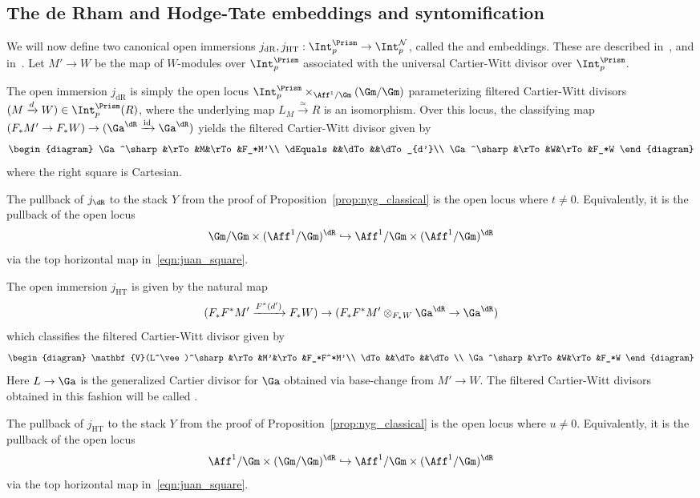 \documentclass[10pt]{amsart}
\begin{document}
\subsection{The de Rham and Hodge-Tate embeddings and syntomification}
\label{subsec:syntomification}

We will now define two canonical open immersions $j_{\mathrm{dR}},j_{\mathrm{HT}}:\Int_p^\Prism\to \Int_p^{\mathcal{N}}$, called the  and  embeddings. These are described in~\cite[\S 5.3,5.6]{drinfeld2022prismatization}, and in~\cite[\S 5.3]{bhatt_lectures}. Let $M'\to W$ be the map of $W$-modules over $\Int_p^\Prism$ associated with the universal Cartier-Witt divisor over $\Int_p^\Prism$.

\begin{definition}
The open immersion $j_{\mathrm{dR}}$ is simply the open locus $\Int_p^\Prism\times_{\Aff^1/\Gm}(\Gm/\Gm)$ parameterizing filtered Cartier-Witt divisors $(M\xrightarrow{d} W)\in \Int_p^\Prism(R)$, where the underlying map $L_M\xrightarrow{\simeq} R$ is an isomorphism. Over this locus, the classifying map $(F_*M'\to F_*W) \to (\Ga^{\dR}\xrightarrow{\mathrm{id}}\Ga^{\dR})$ yields the filtered Cartier-Witt divisor given by
\[
\begin{diagram}
\Ga^\sharp&\rTo&M&\rTo&F_*M'\\
\dEquals&&\dTo&&\dTo_{d'}\\
\Ga^\sharp&\rTo&W&\rTo&F_*W
\end{diagram}
\]
where the right square is Cartesian.

The pullback of $j_{\dR}$ to the stack $Y$ from the proof of Proposition~\ref{prop:nyg_classical} is the open locus where $t\neq 0$. Equivalently, it is the pullback of the open locus 
\[
\Gm/\Gm \times (\Aff^1/\Gm)^{\dR} \hookrightarrow \Aff^1/\Gm\times (\Aff^1/\Gm)^{\dR}
\]
via the top horizontal map in~\eqref{eqn:juan_square}.
\end{definition}

\begin{definition}
The open immersion $j_{\mathrm{HT}}$ is given by the natural map
\[
(F_*F^*M'\xrightarrow{F^*(d')} F_*W)\to (F_*F^*M'\otimes_{F_*W}\Ga^{\dR}\to \Ga^{\dR})
\]
which classifies the filtered Cartier-Witt divisor given by
\[
\begin{diagram}
\mathbf{V}(L^\vee)^\sharp&\rTo&M'&\rTo&F_*F^*M'\\
\dTo&&\dTo&&\dTo\\
\Ga^\sharp&\rTo&W&\rTo&F_*W
\end{diagram}
\]
Here $L\to \Ga$ is the generalized Cartier divisor for $\Ga$ obtained via base-change from $M'\to W$. The filtered Cartier-Witt divisors obtained in this fashion will be called .

The pullback of $j_{\mathrm{HT}}$ to the stack $Y$ from the proof of Proposition~\ref{prop:nyg_classical} is the open locus where $u\neq 0$. Equivalently, it is the pullback of the open locus 
\[
\Aff^1/\Gm \times (\Gm/\Gm)^{\dR} \hookrightarrow \Aff^1/\Gm\times (\Aff^1/\Gm)^{\dR}
\]
via the top horizontal map in~\eqref{eqn:juan_square}.
\end{definition}  
\end{document}
